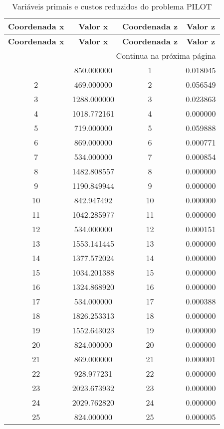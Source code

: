 \documentclass[12pt]{article}
\begin{document}
\begin{longtable}{@{}cccc@{}}
\caption{Variáveis primais e custos reduzidos do problema PILOT} \\
\toprule
\textbf{Coordenada x} & \textbf{Valor x} & \textbf{Coordenada z} & \textbf{Valor z} \\
\midrule
\endfirsthead

\toprule
\textbf{Coordenada x} & \textbf{Valor x} & \textbf{Coordenada z} & \textbf{Valor z} \\
\midrule
\endhead

\midrule \multicolumn{4}{r}{{Continua na próxima página}} \\ \midrule
\endfoot

\bottomrule
\endlastfoot
1 & 850.000000 & 1 & 0.018045 \\
2 & 469.000000 & 2 & 0.056549 \\
3 & 1288.000000 & 3 & 0.023863 \\
4 & 1018.772161 & 4 & 0.000000 \\
5 & 719.000000 & 5 & 0.059888 \\
6 & 869.000000 & 6 & 0.000771 \\
7 & 534.000000 & 7 & 0.000854 \\
8 & 1482.808557 & 8 & 0.000000 \\
9 & 1190.849944 & 9 & 0.000000 \\
10 & 842.947492 & 10 & 0.000000 \\
11 & 1042.285977 & 11 & 0.000000 \\
12 & 534.000000 & 12 & 0.000151 \\
13 & 1553.141445 & 13 & 0.000000 \\
14 & 1377.572024 & 14 & 0.000000 \\
15 & 1034.201388 & 15 & 0.000000 \\
16 & 1324.868920 & 16 & 0.000000 \\
17 & 534.000000 & 17 & 0.000388 \\
18 & 1826.253313 & 18 & 0.000000 \\
19 & 1552.643023 & 19 & 0.000000 \\
20 & 824.000000 & 20 & 0.000000 \\
21 & 869.000000 & 21 & 0.000001 \\
22 & 928.977231 & 22 & 0.000000 \\
23 & 2023.673932 & 23 & 0.000000 \\
24 & 2029.762820 & 24 & 0.000000 \\
25 & 824.000000 & 25 & 0.000005 \\

\end{longtable}
\end{document}
